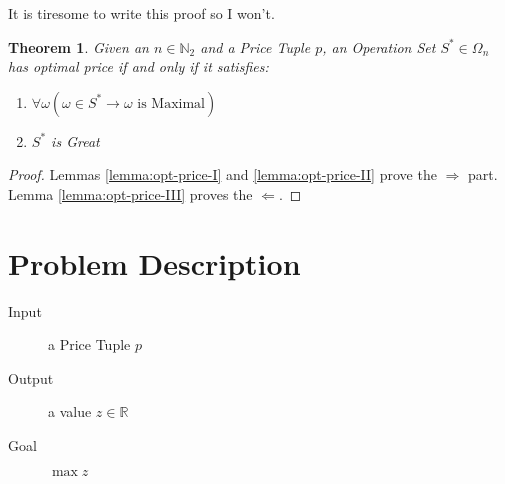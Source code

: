 \documentclass{article}
\newcommand{\R}{\mathbb{R}}
\newcommand{\N}{\mathbb{N}}
\newcommand{\Nb}[1]{\ensuremath{\N_{#1}}}
\newcommand{\Nt}{\Nb{2}}
\newcommand{\tuple}[1]{\ensuremath{\left\langle #1 \right\rangle}}
\newcommand{\great}{Great\xspace}
\newcommand{\op}{\ensuremath{\omega}}
\newcommand{\OS}{\ensuremath{\Omega_{n}}}
\newcommand{\sopt}{\ensuremath{S^{*}}}
\theoremstyle{definition}
\theoremstyle{plain}
\newtheorem{theorem}{Theorem}
\begin{document}
It is tiresome to write this proof so I won't.

\begin{theorem}
    Given an $n \in \Nt$ and a Price Tuple $p$, an Operation Set $\sopt \in \OS$ has optimal price if and only if it satisfies:
    \begin{enumerate}
        \item $\forall \op \left(
            \op \in \sopt \rightarrow \op \mbox{ is Maximal}
        \right)$
        \item $\sopt$ is \great
    \end{enumerate}
\end{theorem}

\begin{proof}
    Lemmas \ref{lemma:opt-price-I} and \ref{lemma:opt-price-II} prove the $\Rightarrow$ part. Lemma \ref{lemma:opt-price-III} proves the $\Leftarrow$.
\end{proof}

\section{Problem Description}

\begin{description}
    \item[Input] a Price Tuple $p$
    \item[Output] a value $z \in \R$
    \item[Goal] $\max z$
\end{description}






\end{document}
